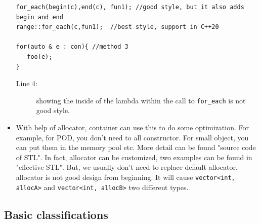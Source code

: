 \documentclass[a4paper,11pt,twoside]{book}
\begin{document}
\begin{itemize}
\begin{lstlisting}
for_each(begin(c),end(c), fun1); //good style, but it also adds begin and end
range::for_each(c,fun1);  //best style, support in C++20

for(auto & e : con){ //method 3
   foo(e);
}
\end{lstlisting}
\begin{description}
\item[Line 4:] showing the inside of the lambda within the call to \texttt{for\_each} is not good style.
\end{description}


	\item With help of allocator, container can use this to do some optimization. For example, for POD, you don't need to all constructor. For small object, you can put them in the memory pool etc.  More detail can be found "source code of STL". In fact, allocator can be customized, two examples can be found in "effective STL".  But, we usually don't need to replace default allocator. allocator is not good design from beginning. It will cause \texttt{vector<int, allocA>} and \texttt{vector<int, allocB>} two different types. 
\end{itemize}


\subsection{Basic classifications}
\end{document}
